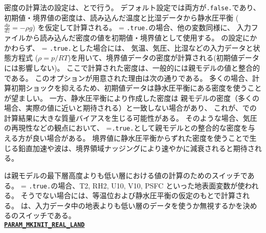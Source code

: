 密度の計算法の設定は、とで行う。
デフォルト設定では両方が\verb|.false.|であり、
初期値・境界値の密度は、読み込んだ温度と比湿データから静水圧平衡 ($\frac{dp}{dz}=-\rho g$) を仮定して計算される。
 = \verb|.true.|の場合、他の変数同様に、
入力ファイルから読み込んだ密度の値を初期値・境界値として使用する。
の設定にかかわらず、 = \verb|.true.|とした場合には、
気温、気圧、比湿などの入力データと状態方程式 ($\rho = p/RT$)を用いて、境界値データの密度が計算される(初期値データには影響しない)。
ここで計算された密度は、一般的には親モデルの値と整合的である。
このオプションが用意された理由は次の通りである。
多くの場合、計算初期ショックを抑えるため、初期値データは静水圧平衡にある密度を使うことが望ましい。
一方、静水圧平衡により作成した密度は
親モデルの密度（多くの場合、実際の値に近いと期待される）と一致しない場合があり、
これが、\scalerm での計算結果に大きな質量バイアスを生じる可能性がある。
そのような場合、気圧の再現性などの観点において、
=\verb|.true.|として親モデルとの整合的な密度を与える方が良い場合がある。
境界値に静水圧平衡からずれた密度を使うことで生じる鉛直加速や波は、境界領域ナッジングにより速やかに減衰されると期待される。


は親モデルの最下層高度よりも低い層における値の計算のためのスイッチである。
 = \verb|.true.|の場合、T2, RH2, U10, V10, PSFC といった地表面変数が使われる。
そうでない場合には、等温位および静水圧平衡の仮定のもとで計算される。
は、入力データ中の地表よりも低い層のデータを使うか無視するかを決めるのスイッチである。
\\

\noindent\textbf{\underline{\texttt{PARAM\_MKINIT\_REAL\_LAND}}}

